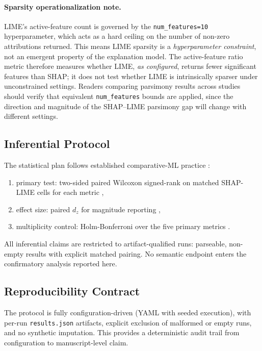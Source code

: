\documentclass[twoside,11pt]{article}
\begin{document}
\paragraph{Sparsity operationalization note.}
LIME's active-feature count is governed by the \texttt{num\_features=10} hyperparameter, which acts as a hard ceiling on the number of non-zero attributions returned. This means LIME sparsity is a \emph{hyperparameter constraint}, not an emergent property of the explanation model. The active-feature ratio metric therefore measures whether LIME, \emph{as configured}, returns fewer significant features than SHAP; it does not test whether LIME is intrinsically sparser under unconstrained settings. Readers comparing parsimony results across studies should verify that equivalent \texttt{num\_features} bounds are applied, since the direction and magnitude of the SHAP–LIME parsimony gap will change with different settings.

\subsection{Inferential Protocol}
\label{sec:inference}

The statistical plan follows established comparative-ML practice
\citep{demsar2006statistical}:
\begin{enumerate}[leftmargin=*]
\item primary test: two-sided paired Wilcoxon signed-rank on matched
SHAP-LIME cells for each metric \citep{wilcoxon1945individual},
\item effect size: paired $d_z$ for magnitude reporting
\citep{lakens2013calculating},
\item multiplicity control: Holm-Bonferroni over the five primary metrics
\citep{holm1979simple}.
\end{enumerate}

All inferential claims are restricted to artifact-qualified runs:
parseable, non-empty results with explicit matched pairing. No semantic
endpoint enters the confirmatory analysis reported here.

\subsection{Reproducibility Contract}
\label{sec:reproducibility}

The protocol is fully configuration-driven (YAML with seeded execution),
with per-run \texttt{results.json} artifacts, explicit exclusion of
malformed or empty runs, and no synthetic imputation. This provides a
deterministic audit trail from configuration to manuscript-level claim.
\end{document}
